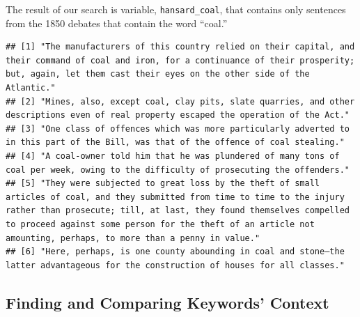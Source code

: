 \documentclass[
]{article}
\newenvironment{Shaded}{\begin{snugshade}}{\end{snugshade}}
\newcommand{\FunctionTok}[1]{\textcolor[rgb]{0.13,0.29,0.53}{\textbf{#1}}}
\newcommand{\NormalTok}[1]{#1}
\newcommand{\SpecialCharTok}[1]{\textcolor[rgb]{0.81,0.36,0.00}{\textbf{#1}}}
\begin{document}
The result of our search is variable, \texttt{hansard\_coal}, that
contains only sentences from the 1850 debates that contain the word
``coal.''

\begin{Shaded}
\end{Shaded}

\begin{verbatim}
## [1] "The manufacturers of this country relied on their capital, and their command of coal and iron, for a continuance of their prosperity; but, again, let them cast their eyes on the other side of the Atlantic."                                                                                                       
## [2] "Mines, also, except coal, clay pits, slate quarries, and other descriptions even of real property escaped the operation of the Act."                                                                                                                                                                                 
## [3] "One class of offences which was more particularly adverted to in this part of the Bill, was that of the offence of coal stealing."                                                                                                                                                                                   
## [4] "A coal-owner told him that he was plundered of many tons of coal per week, owing to the difficulty of prosecuting the offenders."                                                                                                                                                                                    
## [5] "They were subjected to great loss by the theft of small articles of coal, and they submitted from time to time to the injury rather than prosecute; till, at last, they found themselves compelled to proceed against some person for the theft of an article not amounting, perhaps, to more than a penny in value."
## [6] "Here, perhaps, is one county abounding in coal and stone—the latter advantageous for the construction of houses for all classes."
\end{verbatim}

\subsection{Finding and Comparing Keywords'
Context}\label{finding-and-comparing-keywords-context}
\end{document}
